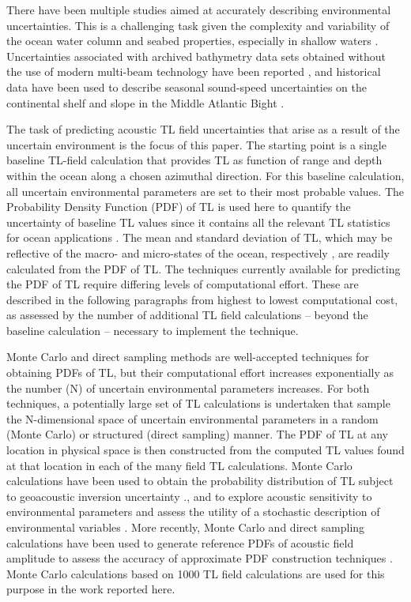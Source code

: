 There have been multiple studies aimed at accurately describing
environmental uncertainties. This is a challenging task given the
complexity and variability of the ocean water column and seabed
properties, especially in shallow waters
\citep{Livingston2006}. Uncertainties associated with archived
bathymetry data sets obtained without the use of modern multi-beam
technology have been reported \citep{Calder2006}, and historical data
have been used to describe seasonal sound-speed uncertainties on the
continental shelf and slope in the Middle Atlantic Bight
\citep{Linder2006}. 

The task of predicting acoustic TL field uncertainties that arise as a
result of the uncertain environment is the focus of this paper. The
starting point is a single baseline TL-field calculation that provides
TL as function of range and depth within the ocean along a chosen
azimuthal direction. For this baseline calculation, all uncertain
environmental parameters are set to their most probable values. The
Probability Density Function (PDF) of TL is used here to quantify the
uncertainty of baseline TL values since it contains all the relevant
TL statistics for ocean applications \citep{Gerstoft2006}. The mean
and standard deviation of TL, which may be reflective of the macro-
and micro-states of the ocean, respectively \citep{Abbot2006}, are
readily calculated from the PDF of TL. The techniques currently
available for predicting the PDF of TL require differing levels of
computational effort. These are described in the following paragraphs
from highest to lowest computational cost, as assessed by the number
of additional TL field calculations – beyond the baseline calculation
– necessary to implement the technique.

Monte Carlo and direct sampling methods are well-accepted techniques
for obtaining PDFs of TL, but their computational effort increases
exponentially as the number (N) of uncertain environmental parameters
increases. For both techniques, a potentially large set of TL
calculations is undertaken that sample the N-dimensional space of
uncertain environmental parameters in a random (Monte Carlo) or
structured (direct sampling) manner. The PDF of TL at any location in
physical space is then constructed from the computed TL values found
at that location in each of the many field TL calculations. Monte
Carlo calculations have been used to obtain the probability
distribution of TL subject to geoacoustic inversion uncertainty
\citep{Gerstoft2006}., and to explore acoustic sensitivity to
environmental parameters and assess the utility of a stochastic
description of environmental variables \citep{Heaney2006}. More
recently, Monte Carlo and direct sampling calculations have been used
to generate reference PDFs of acoustic field amplitude to assess the
accuracy of approximate PDF construction techniques
\citep{James2008,James2011}. Monte Carlo calculations based on 1000 TL
field calculations are used for this purpose in the work reported
here.


